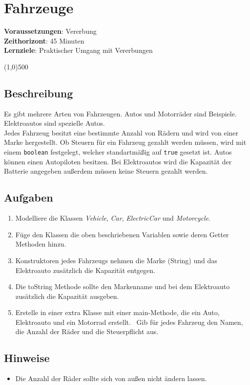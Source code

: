 

\chapter*{Fahrzeuge}

\headingfont
\parbox {\textwidth}{
    \textbf{Voraussetzungen}: Vererbung \\
    \textbf{Zeithorizont}: 45 Minuten \\
    \textbf{Lernziele}: Praktischer Umgang mit Vererbungen
}

\normalfont
\begin{center}
\line(1,0){500}
\end{center}
\vspace{1cm}

\section*{Beschreibung}
Es gibt mehrere Arten von Fahrzeugen. Autos und Motorräder sind Beispiele. Elektroautos sind spezielle Autos. \\
Jedes Fahrzeug besitzt eine bestimmte Anzahl von Rädern und wird von einer Marke hergestellt.
Ob Steuern für ein Fahrzeug gezahlt werden müssen, wird mit einem \texttt{boolean} festgelegt, welcher standartmäßig auf \texttt{true} gesetzt ist.
Autos können einen Autopiloten besitzen. Bei Elektroautos wird die Kapazität der Batterie angegeben außerdem müssen keine Steuern gezahlt werden.

\section*{Aufgaben}
\begin{enumerate}
     \item Modelliere die Klassen \textit{Vehicle}, \textit{Car}, \textit{ElectricCar} und \textit{Motorcycle}.
     \item Füge den Klassen die oben beschriebenen Variablen sowie deren Getter Methoden hinzu.
     \item Konstruktoren jedes Fahrzeugs nehmen die Marke (String) und das Elektroauto zusätzlich die Kapazität entgegen.
     \item Die toString Methode sollte den Markenname und bei dem Elektroauto zusätzlich die Kapazität ausgeben.
     \item Erstelle in einer extra Klasse mit einer main-Methode, die ein Auto, Elektroauto und ein Motorrad erstellt. \
            Gib für jedes Fahrzeug den Namen, die Anzahl der Räder und die Steuerpflicht aus.
\end{enumerate}

\section*{Hinweise}
\begin{itemize}
    \item Die Anzahl der Räder sollte sich von außen nicht ändern lassen.
\end{itemize}
